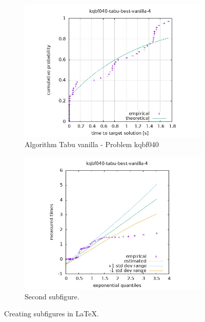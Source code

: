 \begin{figure}[H]
    \centering
    \begin{subfigure}{0.49\textwidth}
        \includegraphics[width=\textwidth]{figure/ttt_plot/kqbf040-tabu-best-vanilla-4-exp.jpeg}
        \caption{Algorithm Tabu vanilla - Problem kqbf040}
        \label{fig:tabu-vanilla-kqbf040-exp}
    \end{subfigure}
    \hfill
    \begin{subfigure}{0.49\textwidth}
        \includegraphics[width=\textwidth]{figure/ttt_plot/kqbf040-tabu-best-vanilla-4-qq.jpeg}
        \caption{Second subfigure.}
        \label{fig:tabu-vanilla-kqbf040-qq}
    \end{subfigure}
    \caption{Creating subfigures in \LaTeX.}
    \label{fig:tabu-vanilla-kqbf040}
\end{figure}


